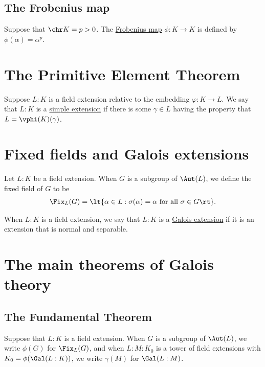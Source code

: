 \documentclass{article}
\begin{document}
\subsection{The Frobenius map}
  \begin{tdefinition}
    Suppose that \( \chr K = p > 0 \).
    The \ul{Frobenius map} \( \phi:K\to K \) is defined by \( \phi(\alpha)=\alpha^p \).
  \end{tdefinition}

\section{The Primitive Element Theorem}
  \begin{tdefinition}
    Suppose \( L:K \) is a field extension relative to the embedding \( \varphi:K\to L \).
    We say that \( L:K \) is a \ul{simple extension} if there is some \( \gamma\in L \) having the property that \( L=\vphi(K)(\gamma) \).
  \end{tdefinition}

\section{Fixed fields and Galois extensions}
  \begin{tdefinition}
    Let \( L:K \) be a field extension.
    When \( G \) is a subgroup of \( \Aut(L) \), we define the fixed field of \( G \) to be \begin{align*}
      \Fix_L(G) = \lt\{ \alpha\in L : \sigma(\alpha) = \alpha \text{ for all } \sigma\in G \rt\}.
    \end{align*}
  \end{tdefinition}

  \begin{tdefinition}
    When \( L:K \) is a field extension, we say that \( L:K \) is a \ul{Galois extension} if it is an extension that is normal and separable.
  \end{tdefinition}

\section{The main theorems of Galois theory}
\subsection{The Fundamental Theorem}
  \begin{tdefinition}
    Suppose that \( L:K \) is a field extension.
    When \( G \) is a subgroup of \( \Aut(L) \), we write \( \phi(G) \) for \( \Fix_L(G) \), and when \( L:M:K_0 \) is a tower of field extensions with \( K_0=\phi(\Gal(L:K)) \), we write \( \gamma(M) \) for \( \Gal(L:M) \).
  \end{tdefinition}
\end{document}
